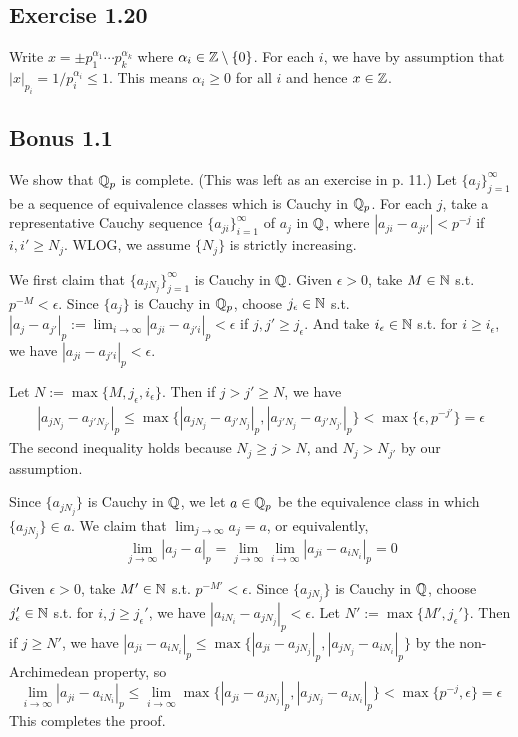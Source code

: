 \documentclass[../Koblitz.tex]{subfiles}
\begin{document}
\subsection*{Exercise 1.20}

Write $x=\pm p_1^{\alpha_1}\cdots p_k^{\alpha_k}$ where $\alpha_i\in\mathbb{Z}\setminus\{0\}$. For each $i$, we have by assumption that $|x|_{p_i} = 1/p_i^{\alpha_i} \leq 1$. This means $\alpha_i \geq 0$ for all $i$ and hence $x\in\mathbb{Z}$.

\subsection*{Bonus 1.1}

We show that $\mathbb{Q}_p$ is complete. (This was left as an exercise in p. 11.) Let $\{a_j\}_{j=1}^\infty$ be a sequence of equivalence classes which is Cauchy in $\mathbb{Q}_p$. For each $j$, take a representative Cauchy sequence $\{a_{ji}\}_{i=1}^\infty$ of $a_j$ in $\mathbb{Q}$, where $|a_{ji}-a_{ji'}|<p^{-j}$ if $i,i'\geq N_j$. WLOG, we assume $\{N_j\}$ is strictly increasing.

We first claim that $\{a_{jN_j}\}_{j=1}^\infty$ is Cauchy in $\mathbb{Q}$. Given $\epsilon>0$, take $M\in\mathbb{N}$ s.t. $p^{-M}<\epsilon$. Since $\{a_j\}$ is Cauchy in $\mathbb{Q}_p$, choose $j_\epsilon\in\mathbb{N}$ s.t. $|a_j-a_{j'}|_p := \lim_{i\to\infty} |a_{ji}-a_{j'i}|_p < \epsilon$ if $j,j'\geq j_\epsilon$. And take $i_\epsilon\in\mathbb{N}$ s.t. for $i\geq i_\epsilon$, we have $|a_{ji}-a_{j'i}|_p <\epsilon$.

Let $N := \max\{M,j_\epsilon,i_\epsilon\}$. Then if $j>j'\geq N$, we have
\begin{align*}
|a_{jN_j}-a_{j'N_{j'}}|_p \leq \max\{|a_{jN_j}-a_{j'N_j}|_p,|a_{j'N_j}-a_{j'N_{j'}}|_p\} < \max\{\epsilon,p^{-j'}\} = \epsilon
\end{align*}
The second inequality holds because $N_j \geq j > N$, and $N_j>N_{j'}$ by our assumption.

Since $\{a_{jN_j}\}$ is Cauchy in $\mathbb{Q}$, we let $a\in\mathbb{Q}_p$ be the equivalence class in which $\{a_{jN_j}\}\in a$. We claim that $\lim_{j\to\infty} a_j=a$, or equivalently, $$\lim_{j\to\infty} |a_j-a|_p = \lim_{j\to\infty}\lim_{i\to\infty} |a_{ji}-a_{iN_i}|_p = 0$$

Given $\epsilon>0$, take $M'\in\mathbb{N}$ s.t. $p^{-M'}<\epsilon$. Since $\{a_{jN_j}\}$ is Cauchy in $\mathbb{Q}$, choose $j_\epsilon'\in\mathbb{N}$ s.t. for $i,j\geq j_\epsilon'$, we have $|a_{iN_i}-a_{jN_j}|_p<\epsilon$. Let $N':=\max\{M',j_\epsilon'\}$. Then if $j\geq N'$, we have $|a_{ji}-a_{iN_i}|_p \leq \max\{|a_{ji}-a_{jN_j}|_p,|a_{jN_j}-a_{iN_i}|_p\}$ by the non-Archimedean property, so $$\lim_{i\to\infty}|a_{ji}-a_{iN_i}|_p \leq \lim_{i\to\infty}\max\{|a_{ji}-a_{jN_j}|_p,|a_{jN_j}-a_{iN_i}|_p\} < \max\{p^{-j},\epsilon\} = \epsilon$$ This completes the proof.
\end{document}
